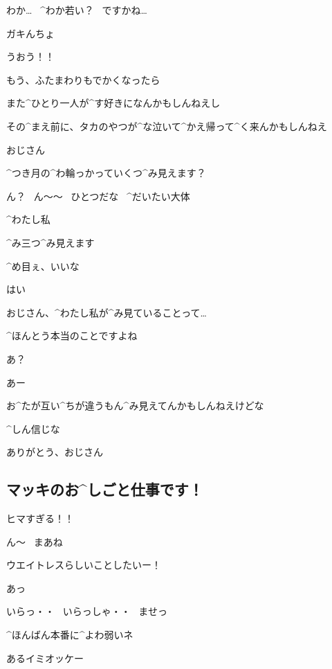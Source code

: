 \page
\Alpha わか…
\ ^{わか}{若}い？
\ ですかね…

\Ojisan ガキんちょ

\Alpha うおう！！

\Ojisan もう、ふたまわりもでかくなったら

\Ojisan また^{ひとり}{一人}が^{す}{好}きになんかもしんねえし

\Ojisan その^{まえ}{前}に、タカのやつが^{な}{泣}いて^{かえ}{帰}って^{く}{来}んかもしんねえ

\page
\Alpha おじさん

\Alpha ^{つき}{月}の^{わ}{輪}っかっていくつ^{み}{見}えます？

\Ojisan ん？
\ ん〜〜
\ ひとつだな
\ ^{だいたい}{大体}

\Alpha ^{わたし}{私}

\Alpha ^{み}{三}つ^{み}{見}えます

\page
\Ojisan ^{め}{目}ぇ、いいな

\Alpha はい

\Alpha おじさん、^{わたし}{私}が^{み}{見}ていることって…

\Alpha ^{ほんとう}{本当}のことですよね

\Ojisan あ？

\Ojisan あー

\Ojisan お^{たが}{互}い^{ちが}{違}うもん^{み}{見}えてんかもしんねえけどな

\Ojisan ^{しん}{信}じな

\page
\Alpha ありがとう、おじさん


\subsection{マッキのお^{しごと}{仕事}です！}

\Makki ヒマすぎる！！

\Alpha ん〜
\ まあね

\Makki ウエイトレスらしいことしたいー！

\Alpha あっ

\Makki いらっ・・
\ いらっしゃ・・
\ ませっ

\Alpha ^{ほんばん}{本番}に^{よわ}{弱}いネ

\Alpha あるイミオッケー
